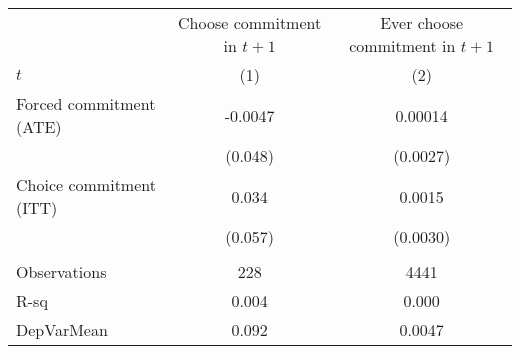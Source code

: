 \begin{tabular}{lcc}
\toprule
      & Choose commitment in $t+1$ & Ever choose commitment in $t+1$ \\
\cmidrule{2-3}$t$   & (1)   & (2) \\
\midrule
\midrule
Forced commitment (ATE) & -0.0047 & 0.00014 \\
      & (0.048) & (0.0027) \\
Choice commitment (ITT) & 0.034 & 0.0015 \\
      & (0.057) & (0.0030) \\
      &       &  \\
\midrule
Observations & 228   & 4441 \\
R-sq  & 0.004 & 0.000 \\
DepVarMean & 0.092 & 0.0047 \\
\bottomrule
\bottomrule
\end{tabular}%
